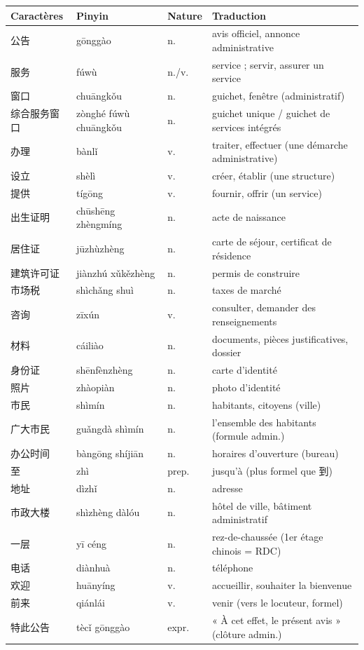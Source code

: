 \documentclass[11pt]{article}
\begin{document}
\begin{center}
\begin{tabularx}{\linewidth}{|X|X|X|X|}
\hline
\rowcolor{popblueL} Caractères & Pinyin & Nature & Traduction \\
\hline
公告 & gōnggào & n. & avis officiel, annonce administrative \\
\hline
服务 & fúwù & n./v. & service ; servir, assurer un service \\
\hline
窗口 & chuāngkǒu & n. & guichet, fenêtre (administratif) \\
\hline
综合服务窗口 & zònghé fúwù chuāngkǒu & n. & guichet unique / guichet de services intégrés \\
\hline
办理 & bànlǐ & v. & traiter, effectuer (une démarche administrative) \\
\hline
设立 & shèlì & v. & créer, établir (une structure) \\
\hline
提供 & tígōng & v. & fournir, offrir (un service) \\
\hline
出生证明 & chūshēng zhèngmíng & n. & acte de naissance \\
\hline
居住证 & jūzhùzhèng & n. & carte de séjour, certificat de résidence \\
\hline
建筑许可证 & jiànzhú xǔkězhèng & n. & permis de construire \\
\hline
市场税 & shìchǎng shuì & n. & taxes de marché \\
\hline
咨询 & zīxún & v. & consulter, demander des renseignements \\
\hline
材料 & cáiliào & n. & documents, pièces justificatives, dossier \\
\hline
身份证 & shēnfènzhèng & n. & carte d'identité \\
\hline
照片 & zhàopiàn & n. & photo d'identité \\
\hline
市民 & shìmín & n. & habitants, citoyens (ville) \\
\hline
广大市民 & guǎngdà shìmín & n. & l'ensemble des habitants (formule admin.) \\
\hline
办公时间 & bàngōng shíjiān & n. & horaires d'ouverture (bureau) \\
\hline
至 & zhì & prep. & jusqu'à (plus formel que 到) \\
\hline
地址 & dìzhǐ & n. & adresse \\
\hline
市政大楼 & shìzhèng dàlóu & n. & hôtel de ville, bâtiment administratif \\
\hline
一层 & yī céng & n. & rez-de-chaussée (1er étage chinois = RDC) \\
\hline
电话 & diànhuà & n. & téléphone \\
\hline
欢迎 & huānyíng & v. & accueillir, souhaiter la bienvenue \\
\hline
前来 & qiánlái & v. & venir (vers le locuteur, formel) \\
\hline
特此公告 & tècǐ gōnggào & expr. & « À cet effet, le présent avis » (clôture admin.) \\
\hline
\end{tabularx}
\end{center}
\end{document}
